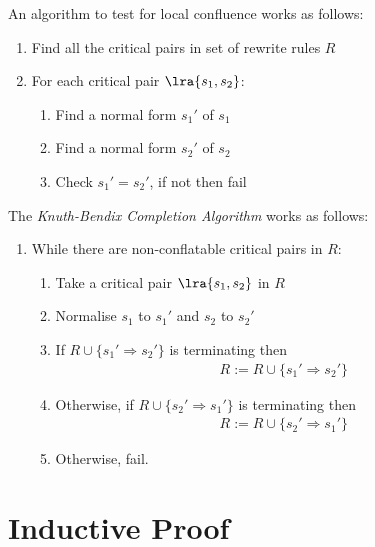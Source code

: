 \documentclass{article}
\begin{document}
\begin{theorem}
    An algorithm to test for local confluence works as follows:
    \begin{enumerate}
        \item Find all the critical pairs in set of rewrite rules $R$
        \item For each critical pair $\lra{s_1, s_2}$: \begin{enumerate}
                  \item Find a normal form $s_1'$ of $s_1$
                  \item Find a normal form $s_2'$ of $s_2$
                  \item Check $s_1'=s_2'$, if not then fail
              \end{enumerate}
    \end{enumerate}
\end{theorem}

\begin{theorem}
    The \emph{Knuth-Bendix Completion Algorithm} works as follows:
    \begin{enumerate}
        \item While there are non-conflatable critical pairs in $R$: \begin{enumerate}
                  \item Take a critical pair $\lra{s_1, s_2}$ in $R$
                  \item Normalise $s_1$ to $s_1'$ and $s_2$ to $s_2'$
                  \item If $R\cup\{s_1'\Rightarrow s_2'\}$ is terminating then \begin{align*}
                            R := R \cup \{s_1'\Rightarrow s_2'\}
                        \end{align*}
                  \item Otherwise, if $R\cup\{s_2'\Rightarrow s_1'\}$ is terminating then \begin{align*}
                            R := R \cup \{s_2' \Rightarrow s_1'\}
                        \end{align*}
                  \item Otherwise, fail.
              \end{enumerate}
    \end{enumerate}
\end{theorem}

\section{Inductive Proof}
\end{document}
